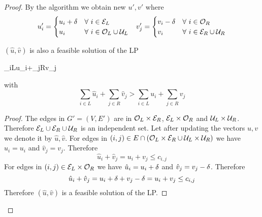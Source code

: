 \begin{proof}
	By the algorithm we obtain new $u',v'$ where \begin{align*}
		u'_i=\begin{cases}
			u_i+\delta & \forall\ i\in \mathcal{E}_L\\
			u_i & \forall\ i\in \mathcal{O}_L\cup \mathcal{U}_L
		\end{cases}  && v'_j=\begin{cases}
			v_i-\delta & \forall\ i\in \mathcal{O}_R\\
			v_i & \forall\ i\in \mathcal{E}_R\cup \mathcal{U}_R
		\end{cases} 
	\end{align*}
	\begin{claimwidth}
		\begin{claim}{}{}
			$(\hat{u},\hat{v})$ is also a feasible solution of the LP \begin{maxi*}{}{\sum_{i\in L}u_i+\sum_{j\in R}v_j}{}{}
			\end{maxi*} with $$\sum\limits_{i\in L}\hat{u}_i+\sum\limits_{j\in R}\hat{v}_j> \sum\limits_{i\in L}u_i+\sum\limits_{j\in R}v_j$$
		\end{claim}
		\begin{proof}
			The edges in $G'=(V,E')$ are in $\mathcal{O}_L\times \mathcal{E}_R$, $\mathcal{E}_L\times \mathcal{O}_R$ and $\mathcal{U}_L\times \mathcal{U}_R$. Therefore $\mathcal{E}_L\cup \mathcal{E}_R\cup \mathcal{U}_R$ is an independent set. Let after updating the vectors $u,v$ we denote it by $\hat{u},\hat{v}$. For edges in $(i,j)\in E\cap (\mathcal{O}_L\times\mathcal{E}_R \cup   \mathcal{U}_L\times \mathcal{U}_R)$ we have $\hat{u}_i=u_i$ and $\hat{v}_j=v_j$. Therefore  $$\hat{u}_i+\hat{v}_j=u_i+v_j\leq c_{i,j}$$For edges in $(i,j)\in  \mathcal{E}_L\times \mathcal{O}_R$ we have $\hat{u}_i=u_i+\delta$ and $\hat{v}_j=v_j-\delta$. Therefore  $$\hat{u}_i+\hat{v}_j=u_i+\delta+v_j-\delta=u_i+v_j\leq c_{i,j}$$Therefore $(\hat{u},\hat{v})$ is a feasible solution of the LP. 
			

\end{proof}
\end{claimwidth}
\end{proof}
